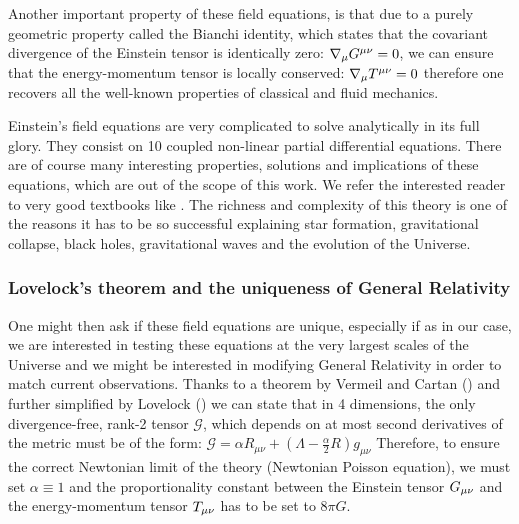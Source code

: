 Another important property of these field equations, is that due to a purely geometric property called the Bianchi identity, which
states that the covariant divergence of the Einstein tensor is identically zero:
$\nabla_{\mu} G^{\mu \nu} = 0$, 
we can ensure that the energy-momentum tensor is locally conserved:
\beeqc$
\nabla_{\mu} T^{\mu \nu} = 0
$
therefore one recovers all the well-known properties of classical and fluid mechanics.

Einstein's field equations are very complicated to solve analytically in its full glory. They consist on
10 coupled non-linear partial differential equations.
There are of course many interesting properties, solutions and implications of these equations, 
which are out of the scope of this work.
We refer the interested reader to very good textbooks like \cite{Carroll, Schultz, Misner, Thorne, Wheeler, Wald}.
The richness and complexity of this theory is one of the reasons it has to be so successful explaining 
star formation, gravitational collapse, black holes, gravitational waves and the evolution of the Universe.

\subsubsection{Lovelock's theorem and the uniqueness of General Relativity}

One might then ask if these field equations are unique, especially if as in our case, 
we are interested in testing these equations at the very largest scales of the Universe and we might 
be interested in modifying General Relativity in order to match current observations.
Thanks to a theorem by Vermeil and Cartan (\cite{cite Vermeil, Cartan, 1921}) 
and further simplified by Lovelock (\cite{1970, Lovelock}) we can state that in 4 dimensions,
the only divergence-free, rank-2 tensor $\mathcal{G}$, which depends on at most second derivatives
of the metric must be of the form:
\beeqp$
\mathcal{G} =  \alpha R_{\mu \nu} + \left( \Lambda - \frac{\alpha}{2} R \right) g_{\mu \nu}
$
Therefore, to ensure the correct Newtonian limit of the theory (Newtonian Poisson equation), we must set $\alpha \equiv 1$
and the proportionality constant between the Einstein tensor $G_{\mu \nu}$  and the energy-momentum tensor
$T_{\mu \nu}$ has to be set to $8 \pi G$.

